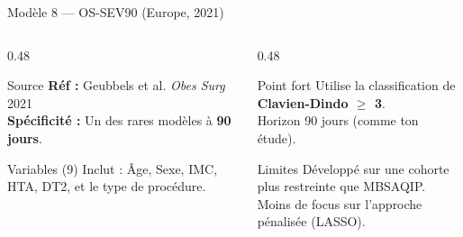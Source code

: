 \documentclass[aspectratio=169]{beamer}
\begin{document}
\begin{frame}[shrink=5]{Modèle 8 --- OS-SEV90 (Europe, 2021)}
  \begin{columns}[T]
    \begin{column}{0.48\textwidth}
      \begin{block}{Source}
        \footnotesize
        \textbf{Réf :} Geubbels et al. \textit{Obes Surg} 2021\\
        \textbf{Spécificité :} Un des rares modèles à \textbf{90 jours}.
      \end{block}
      \begin{block}{Variables (9)}
        \footnotesize
        Inclut : Âge, Sexe, IMC, HTA, DT2, et le type de procédure.
      \end{block}
    \end{column}
    \begin{column}{0.48\textwidth}
      \begin{exampleblock}{Point fort}
        \footnotesize
        Utilise la classification de \textbf{Clavien-Dindo $\geq$ 3}.\\
        Horizon 90 jours (comme ton étude).
      \end{exampleblock}
      \begin{alertblock}{Limites}
        \footnotesize
        Développé sur une cohorte plus restreinte que MBSAQIP.\\
        Moins de focus sur l'approche pénalisée (LASSO).
      \end{alertblock}
    \end{column}
  \end{columns}
\end{frame}
\end{document}
